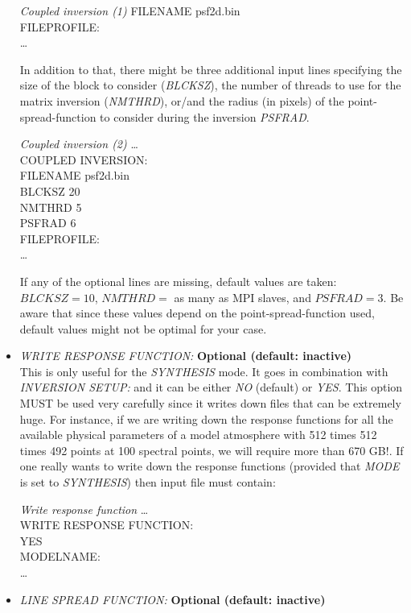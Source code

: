 \begin{itemize}
\begin{ifbox}[label={tb:coupled_inversion1}]{{\it Coupled inversion (1)}}
  FILENAME  psf2d.bin\\
  FILEPROFILE:\\
  \ldots
  \normalsize
\end{ifbox}
  In addition to that, there might be three additional input lines specifying the size of the block to consider ({\it BLCKSZ}), the number of threads to use for the matrix inversion ({\it NMTHRD}), or/and the radius (in pixels) of the point-spread-function to consider during the inversion {\it PSFRAD}.\\
\begin{ifbox}[label={tb:coupled_inversion1}]{{\it Coupled inversion (2)}}
  \scriptsize
  \ldots\\
  COUPLED INVERSION:\\
  FILENAME  psf2d.bin\\
  BLCKSZ 20\\
  NMTHRD 5\\
  PSFRAD 6\\
  FILEPROFILE:\\
  \ldots
  \normalsize
\end{ifbox}
  If any of the optional lines are missing, default values are taken: $BLCKSZ=10$, $NMTHRD=$ as many as MPI slaves, and $PSFRAD=3$. Be aware that since these values depend on the point-spread-function used, default values might not be optimal for your case.
  \item {\it WRITE RESPONSE FUNCTION:} {\bf Optional (default: inactive)}\\
  This is only useful for the {\it SYNTHESIS} mode. It goes in combination with {\it INVERSION SETUP:} and it can be either {\it NO} (default) or {\it YES}. This option MUST be used very carefully since it writes down files that can be extremely huge. For instance, if we are writing down the response functions for all the available physical parameters of a model atmosphere with 512 times 512 times 492 points at 100 spectral points, we will require more than 670 GB!. If one really wants to write down the response functions (provided that {\it MODE} is set to {\it SYNTHESIS}) then input file must contain:
\begin{ifbox}[label={tb:write_response_function}]{{\it Write response function}}
  \scriptsize
  \ldots\\
  WRITE RESPONSE FUNCTION:\\
  YES\\
  MODELNAME:\\
  \ldots
  \normalsize
\end{ifbox}
  \item {\it LINE SPREAD FUNCTION:} {\bf Optional (default: inactive)}\\

\end{itemize}
